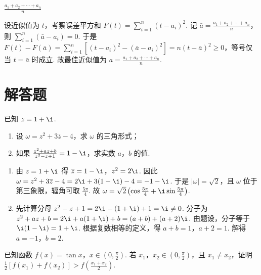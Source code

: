 \documentclass[UTF8,a4paper,oneside,11pt]{ctexbook}
\begin{document}
\begin{answer}
\(\frac{a_1 + a_2 + \cdots + a_n}{n}\)
\end{answer}

\begin{solution}
设近似值为 \(t\)，考察误差平方和 \(F(t) = \sum_{i=1}^{n}\left(t - a_i\right)^2\). 记 \(\bar{a} = \frac{a_1 + a_2 + \cdots + a_n}{n}\)，则 \(\sum_{i=1}^{n}\left(\bar{a} - a_i\right) = 0\). 于是 \(F(t) - F(\bar{a}) = \sum_{i=1}^{n}\left[\left(t - a_i\right)^2 - \left(\bar{a} - a_i\right)^2\right] = n\left(t - \bar{a}\right)^2 \geqslant 0\)，等号仅当 \(t = \bar{a}\) 时成立. 故最佳近似值为 \(a = \frac{a_1 + a_2 + \cdots + a_n}{n}\).
\end{solution}

\section{解答题}

\begin{problem}
已知 \(z = 1 + \i\).

\begin{enumerate}
\item 设 \(\omega = z^2 + 3\overline{z} - 4\)，求 \(\omega\) 的三角形式；
\item 如果 \(\frac{z^2 + az + b}{z^2 - z + 1} = 1 - \i\)，求实数 \(a\)，\(b\) 的值.
\end{enumerate}
\end{problem}

\begin{solution}
\begin{enumerate}
\item 由 \(z = 1 + \i\) 得 \(\overline{z} = 1 - \i\)，\(z^2 = 2\i\). 因此 \(\omega = z^2 + 3\overline{z} - 4 = 2\i + 3(1 - \i) - 4 = -1 - \i\). 于是 \(|\omega| = \sqrt{2}\)，且 \(\omega\) 位于第三象限，辐角可取 \(\frac{5\pi}{4}\). 故 \(\omega = \sqrt{2}\left(\cos \frac{5\pi}{4} + \i\sin \frac{5\pi}{4}\right)\).
\item 先计算分母 \(z^2 - z + 1 = 2\i - (1 + \i) + 1 = \i \neq 0\). 分子为 \(z^2 + az + b = 2\i + a(1 + \i) + b = (a + b) + (a + 2)\i\). 由题设，分子等于 \(\i(1 - \i) = 1 + \i\). 根据复数相等的定义，得 \(a + b = 1\)，\(a + 2 = 1\). 解得 \(a = -1\)，\(b = 2\).
\end{enumerate}
\end{solution}

\begin{problem}
已知函数 \(f(x) = \tan x\)，\(x \in \left(0, \frac{\pi}{2}\right)\). 若 \(x_1\)，\(x_2 \in \left(0, \frac{\pi}{2}\right)\)，且 \(x_1 \neq x_2\)，证明 \(\frac{1}{2}\left[f(x_1) + f(x_2)\right] > f\left(\frac{x_1 + x_2}{2}\right)\).
\end{problem}
\end{document}
